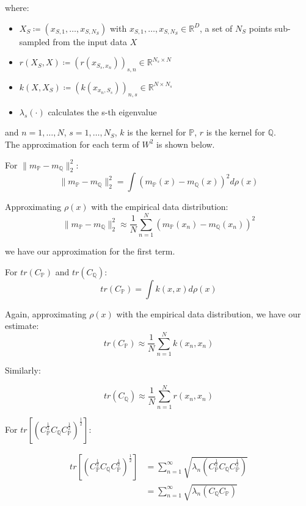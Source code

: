 \documentclass[twoside,11pt]{article}
\begin{document}
where:
\begin{itemize}
    \item $X_S \coloneqq (x_{S, 1}, \dots, x_{S, N_S})$ with $x_{S, 1}, \dots, x_{S, N_S} \in \mathbb{R}^D$, a set of $N_S$ points sub-sampled from the input data $X$
    \item $r(X_S, X) \coloneqq \left(r(x_{S_s, x_n})\right)_{s, n} \in \mathbb{R}^{N_s \times N}$
    \item $k(X, X_S) \coloneqq \left(k(x_{x_n, S_s})\right)_{n, s} \in \mathbb{R}^{N \times N_s}$
    \item $\lambda_s(\cdot)$ calculates the s-th eigenvalue
\end{itemize}

and $n=1,\dots, N$, $s=1, \dots, N_S$, $k$ is the kernel for $\mathbb{P}$, $r$ is the kernel for $\mathbb{Q}$. \\

The approximation for each term of $W^2$ is shown below.

For $\|m_{\mathbb{P}} - m_{\mathbb{Q}}\|_2^2$:
\[\|m_{\mathbb{P}} - m_{\mathbb{Q}}\|_2^2 = \int \left(m_{\mathbb{P}}(x) - m_{\mathbb{Q}}(x)\right)^2 d\rho(x)\]

Approximating $\rho(x)$ with the empirical data distribution:
\[\|m_{\mathbb{P}} - m_{\mathbb{Q}}\|_2^2 \approx \frac{1}{N}\sum_{n=1}^N (m_{\mathbb{P}}(x_n)-m_{\mathbb{Q}}(x_n))^2\]

we have our approximation for the first term.

For $tr(C_{\mathbb{P}})$ and  $tr(C_{\mathbb{Q}})$:
\[tr(C_{\mathbb{P}}) = \int k(x, x) d\rho(x)\]

Again, approximating $\rho(x)$ with the empirical data distribution, we have our estimate:
\[tr(C_{\mathbb{P}}) \approx \frac{1}{N}\sum_{n=1}^{N}k(x_n, x_n)\]

Similarly:

\[tr(C_{\mathbb{Q}})  \approx \frac{1}{N}\sum_{n=1}^{N}r(x_n, x_n)\]

For $tr \left[ \left( C_{\mathbb{P}}^{\frac{1}{2}}C_{\mathbb{Q}}C_{\mathbb{P}}^{\frac{1}{2}}\right)^{\frac{1}{2}}\right]$:

\begin{align*}
tr \left[ \left( C_{\mathbb{P}}^{\frac{1}{2}}C_{\mathbb{Q}}C_{\mathbb{P}}^{\frac{1}{2}}\right)^{\frac{1}{2}}\right] &= \sum_{n=1}^{\infty} \sqrt {\lambda_n\left( C_{\mathbb{P}}^{\frac{1}{2}}C_{\mathbb{Q}}C_{\mathbb{P}}^{\frac{1}{2}}\right)}\\
&= \sum_{n=1}^{\infty} \sqrt {\lambda_n\left( C_{\mathbb{Q}}C_{\mathbb{P}}\right)}
\end{align*}
\end{document}
